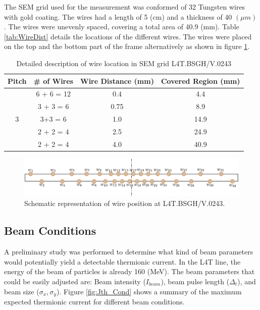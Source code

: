 The SEM grid used for the measurement was conformed of 32 Tungsten wires with gold coating. The wires had a length of 5 (cm) and a thickness of 40 $(\mu m)$. The wires were unevenly spaced, covering a total area of 40.9 (mm). Table \ref{tab:WireDist} details the locations of the different wires. The wires were placed on the top and the bottom part of the frame alternatively as shown in figure \ref{fig:WireLocation}.

\begin{table}[h]
    \centering
    \begin{tabular}{cccc}
    \hline
    Pitch              & \# of Wires & Wire Distance (mm) & Covered Region (mm) \\ \hline
    \multirow{5}{*}{3} & 6 + 6 = 12  & 0.4                & 4.4                 \\
                       & 3 + 3 = 6   & 0.75               & 8.9                 \\
                       & 3+3 = 6     & 1.0                & 14.9                \\
                       & 2 + 2 = 4   & 2.5                & 24.9                \\
                       & 2 + 2 = 4   & 4.0                & 40.9                \\ \hline
    \end{tabular}
    \label{tab:WireSpacing}
    \caption{Detailed description of wire location in SEM grid L4T.BSGH/V.0243}
\end{table}


\begin{figure}[h]
    \centering
    \includegraphics[width=0.90\columnwidth]{Figure_SemGridSchema/SemGridSchema.pdf}
    \caption{Schematic representation of wire position at L4T.BSGH/V.0243. }
    \label{fig:WireLocation}
\end{figure}

\subsection{Beam Conditions}

A preliminary study was performed to determine what kind of beam parameters would potentially yield a detectable thermionic current. In the L4T line, the energy of the \hm beam of particles is already 160 (MeV). The beam parameters that could be easily adjusted are: Beam intensity ($I_{beam}$), beam pulse length ($\Delta_t$), and beam size ($\sigma_x , \sigma_y$). Figure \ref{fig:Jth_Cond} shows a summary of the maximum expected thermionic current for different beam conditions. 

